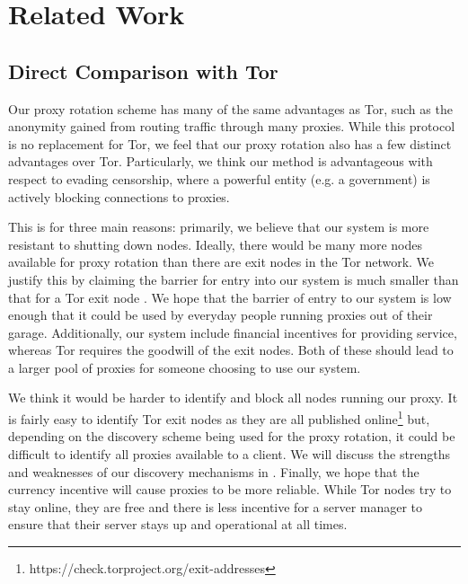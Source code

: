 \section{Related Work}
\label{sec:related}

\subsection{Direct Comparison with Tor}

Our proxy rotation scheme has many of the same advantages as Tor, such as the anonymity gained from routing traffic through many proxies. While this protocol is no replacement for Tor, we feel that our proxy rotation also has a few distinct advantages over Tor. Particularly, we think our method is advantageous with respect to evading censorship, where a powerful entity (e.g. a government) is actively blocking connections to proxies.

This is for three main reasons: primarily, we believe that our system is more resistant to shutting down nodes. Ideally, there would be many more nodes available for proxy rotation than there are exit nodes in the Tor network. We justify this by claiming the barrier for entry into our system is much smaller than that for a Tor exit node . We hope that the barrier of entry to our system is low enough that it could be used by everyday people running proxies out of their garage.  Additionally, our system include financial incentives for providing service, whereas Tor requires the goodwill of the exit nodes. Both of these should lead to a larger pool of proxies for someone choosing to use our system.

We think it would be harder to identify and block all nodes running our proxy. It is fairly easy to identify Tor exit nodes as they are all published online\footnote{https://check.torproject.org/exit-addresses} but, depending on the discovery scheme being used for the proxy rotation, it could be difficult to identify all proxies available to a client. We will discuss the strengths and weaknesses of our discovery mechanisms in . Finally, we hope that the currency incentive will cause proxies to be more reliable. While Tor nodes try to stay online, they are free and there is less incentive for a server manager to ensure that their server stays up and operational at all times.


